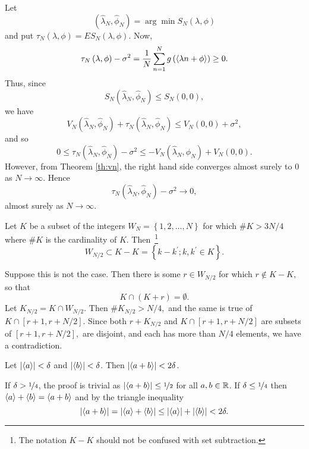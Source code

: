Let
\begin{equation}
\left(  \widehat{\lambda}_{N},\widehat{\phi}_{N}\right)  =\arg\min
S_{N}\left(  \lambda,\phi\right)  \label{eq:lsest}%
\end{equation}
and put $\tau_{N}\left(  \lambda,\phi\right)  =ES_{N}\left(  \lambda
,\phi\right)  .$ Now,%
\[
\tau_{N}\left(  \lambda,\phi\right)  -\sigma^{2}  =\frac{1}{N}\sum
_{n=1}^{N}g\left(  \left<   \lambda n+\phi  \right>  \right)  \geq 0.
\]
Thus, since%
\[
S_{N}\left(  \widehat{\lambda}_{N},\widehat{\phi}_{N}\right)  \leq
S_{N}\left(  0,0\right)  ,
\]
we have%
\[
V_{N}\left(  \widehat{\lambda}_{N},\widehat{\phi}_{N}\right)  +\tau_{N}\left(
\widehat{\lambda}_{N},\widehat{\phi}_{N}\right)  \leq V_{N}\left(  0,0\right)
+\sigma^{2},
\]
and so%
\[
0  \leq\tau_{N}\left(  \widehat{\lambda}_{N},\widehat{\phi}_{N}\right)
-\sigma^{2} \leq-V_{N}\left(  \widehat{\lambda}_{N},\widehat{\phi}_{N}\right)
+V_{N}\left(  0,0\right)  .
\]
However, from Theorem \ref{th:vn}, the right hand side converges almost surely
to $0$ as $N\rightarrow\infty.$ Hence%
\begin{equation}
\tau_{N}\left(  \widehat{\lambda}_{N},\widehat{\phi}_{N}\right)  -\sigma
^{2}\rightarrow0, \label{eq:taucon}%
\end{equation}
almost surely as $N\rightarrow\infty.$

\begin{lemma}
\label{lem:moran}Let $K$ be a subset of the integers $W_{N}=\left\{
1,2,\ldots,N\right\}  $ for which $\#K>3N/4$ where $\#K$ is the cardinality of $K$. Then~\footnote{The notation $K-K$ should not be confused with set subtraction.}
\[
W_{N/2}\subset K-K=\left\{  k-k^{\prime};k,k^{\prime}\in K\right\}.
\]

\end{lemma}

\begin{IEEEproof}
Suppose this is not the case. Then there is some $r\in W_{N/2}$ for which
$r\notin K-K,$ so that%
\[
K\cap\left(  K+r\right)  =\emptyset.
\]
Let $K_{N/2}=K\cap W_{N/2}.$ Then $\#K_{N/2}>N/4,$ and the same is true of
$K\cap\left[  r+1,r+N/2\right]  .$ Since both $r+K_{N/2}$ and $K\cap\left[
r+1,r+N/2\right]  $ are subsets of $\left[  r+1,r+N/2\right]  ,$ are disjoint,
and each has more than $N/4$ elements, we have a contradiction.
\end{IEEEproof}

\begin{lemma} \label{lem:fracpartsumanddelta}
Let $\left|\left< a \right>\right| < \delta$ and $\left|\left< b \right>\right| < \delta$.  Then $\left|\left< a + b \right>\right| < 2\delta$.
\end{lemma}
\begin{IEEEproof}
  If $\delta > \nicefrac{1}{4}$, the proof is trivial as $\left|\left< a +
    b \right>\right| \leq \nicefrac{1}{2}$ for all $a,b \in {\mathbb R}$.  If $\delta
  \leq \nicefrac{1}{4}$ then $\left< a \right> + \left< b \right> = \left< a + b \right>$ and by the triangle
  inequality
\[
\left|\left< a + b \right>\right| = \left|\left< a \right> + \left< b \right>\right| \leq \left|\left< a \right>\right| + \left|\left< b \right>\right| < 2\delta.
\] 
\end{IEEEproof}

